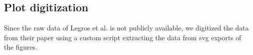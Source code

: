 \subsection{Plot digitization}
Since the raw data of Legros et al. is not publicly available, we digitized the data from their
paper using a custom script extracting the data from svg exports of the figures.
